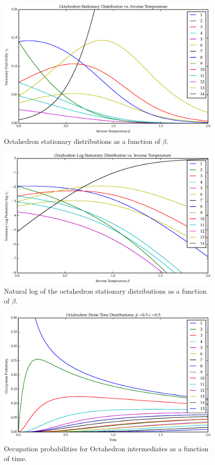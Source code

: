 \begin{figure}[ht]
\label{fig:OctaPi}
\centering
  \includegraphics[scale=0.6]{images/octahedron_pi.eps}
\caption{Octahedron stationary distributions as a function of $\beta$.}
\end{figure}

\begin{figure}[ht]
\label{fig:OctaLogPi}
\centering
  \includegraphics[scale=0.6]{images/octahedron_log_pi.eps}
\caption{Natural log of the octahedron stationary distributions as a function of $\beta$.}
\end{figure}

\begin{figure}[ht]
\label{fig:OctaFinDist}
\centering
  \includegraphics[scale=0.6]{images/octahedron_finite_dist.eps}
\caption{Occupation probabilities for Octahedron intermediates as a function of time.}
\end{figure}

